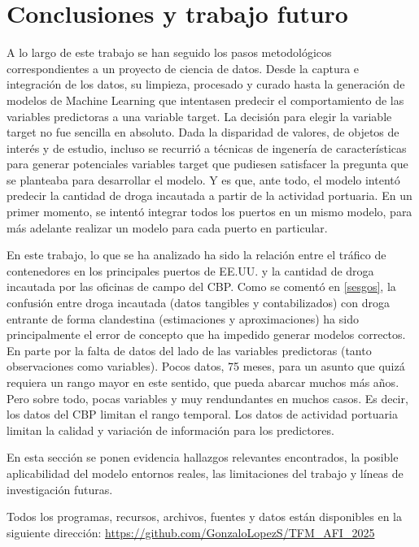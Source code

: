 \documentclass[12pt]{article}
\begin{document}
\section{\label{trabajo futuro}Conclusiones y trabajo futuro}
A lo largo de este trabajo se han seguido los pasos metodológicos correspondientes a un proyecto de ciencia de datos. Desde la captura e integración de los datos, su limpieza, procesado y curado hasta la generación de modelos de Machine Learning que intentasen predecir el comportamiento de las variables predictoras a una variable target. La decisión para elegir la variable target no fue sencilla en absoluto. Dada la disparidad de valores, de objetos de interés y de estudio, incluso se recurrió a técnicas de ingenería de características para generar potenciales variables target que pudiesen satisfacer la pregunta que se planteaba para desarrollar el modelo. Y es que, ante todo, el modelo intentó predecir la cantidad de droga incautada a partir de la actividad portuaria. En un primer momento, se intentó integrar todos los puertos en un mismo modelo, para más adelante realizar un modelo para cada puerto en particular.

En este trabajo, lo que se ha analizado ha sido la relación entre el tráfico de contenedores en los principales puertos de EE.UU. y la cantidad de droga incautada por las oficinas de campo del CBP. Como se comentó en \ref{sesgos}, la confusión entre droga incautada (datos tangibles y contabilizados) con droga entrante de forma clandestina (estimaciones y aproximaciones) ha sido principalmente el error de concepto que ha impedido generar modelos correctos. En parte por la falta de datos del lado de las variables predictoras (tanto observaciones como variables). Pocos datos, 75 meses, para un asunto que quizá requiera un rango mayor en este sentido, que pueda abarcar muchos más años. Pero sobre todo, pocas variables y muy rendundantes en muchos casos. Es decir, los datos del CBP limitan el rango temporal. Los datos de actividad portuaria limitan la calidad y variación de información para los predictores.

En esta sección se ponen evidencia hallazgos relevantes encontrados, la posible aplicabilidad del modelo entornos reales, las limitaciones del trabajo y líneas de investigación futuras.

Todos los programas, recursos, archivos, fuentes y datos están disponibles en la siguiente dirección:
\url{https://github.com/GonzaloLopezS/TFM_AFI_2025}
\end{document}
